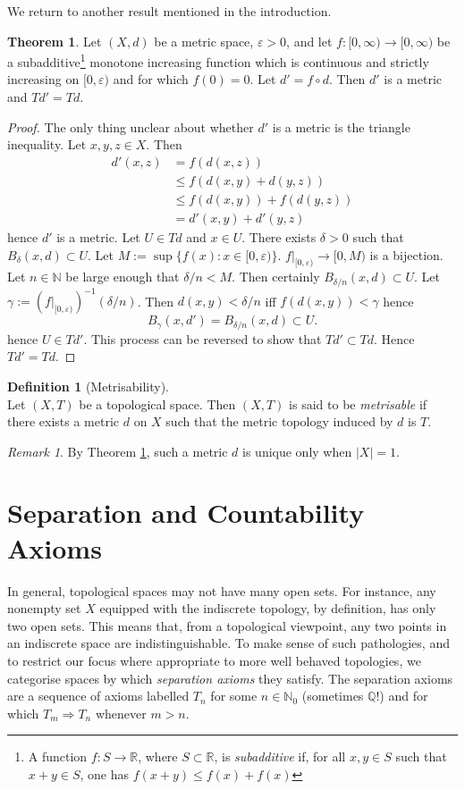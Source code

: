 \documentclass{book}
\theoremstyle{definition}
\newtheorem{theorem}{Theorem}[section]
\newtheorem{definition}{Definition}[section]
\theoremstyle{remark}
\newtheorem{remark}{Remark}[section]
\newcommand{\R}{\mathbb{R}}
\newcommand{\Q}{\mathbb{Q}}
\newcommand{\N}{\mathbb{N}}
\begin{document}
We return to another result mentioned in the introduction.

\begin{theorem}
\label{metricsbewild}
Let $(X,d)$ be a metric space, $\varepsilon>0$, and let $f:[0,\infty)\to[0,\infty)$ be a subadditive\footnote{A function $f:S\to\R$, where $S\subset \R$, is \textit{subadditive} if, for all $x,y\in S$ such that $x+y\in S$, one has $f(x+y)\leq f(x)+f(x)$} monotone increasing function which is continuous and strictly increasing on $[0,\varepsilon)$ and for which $f(0)=0$. Let $d'=f\circ d$. Then $d'$ is a metric and $Td'=Td$.
\end{theorem}
\begin{proof}
The only thing unclear about whether $d'$ is a metric is the triangle inequality. Let $x,y,z\in X$. Then
\begin{align*}
    d'(x,z)&=f(d(x,z))\\
    &\leq f(d(x,y)+d(y,z))\\
    &\leq f(d(x,y))+f(d(y,z))\\
    &=d'(x,y)+d'(y,z)
\end{align*}
hence $d'$ is a metric. Let $U\in Td$ and $x\in U$. There exists $\delta>0$ such that $B_\delta(x,d)\subset U$. Let $M:=\sup\{f(x):x\in[0,\varepsilon)\}$. $f|_{[0,\varepsilon)}\to[0,M)$ is a bijection. Let $n\in\N$ be large enough that $\delta/n<M$. Then certainly $B_{\delta/n}(x,d)\subset U$. Let $\gamma:=(f|_{[0,\varepsilon)})^{-1}(\delta/n)$. Then $d(x,y)<\delta/n$ iff $f(d(x,y))<\gamma$ hence
$$B_\gamma(x,d')=B_{\delta/n}(x,d)\subset U.$$
hence $U\in Td'$. This process can be reversed to show that $Td'\subset Td$. Hence $Td'=Td$.
\end{proof}

\begin{definition}[Metrisability]$ $\\
Let $(X,T)$ be a topological space. Then $(X,T)$ is said to be \textit{metrisable} if there exists a metric $d$ on $X$ such that the metric topology induced by $d$ is $T$.
\end{definition}

\begin{remark}
By Theorem \ref{metricsbewild}, such a metric $d$ is unique only when $|X|=1$.
\end{remark}

\chapter{Separation and Countability Axioms}
In general, topological spaces may not have many open sets. For instance, any nonempty set $X$ equipped with the indiscrete topology, by definition, has only two open sets. This means that, from a topological viewpoint, any two points in an indiscrete space are indistinguishable. To make sense of such pathologies, and to restrict our focus where appropriate to more well behaved topologies, we categorise spaces by which \textit{separation axioms} they satisfy. The separation axioms are a sequence of axioms labelled $T_n$ for some $n\in\N_0$ (sometimes $\Q$!) and for which $T_m\Rightarrow T_n$ whenever $m>n$.
\end{document}

